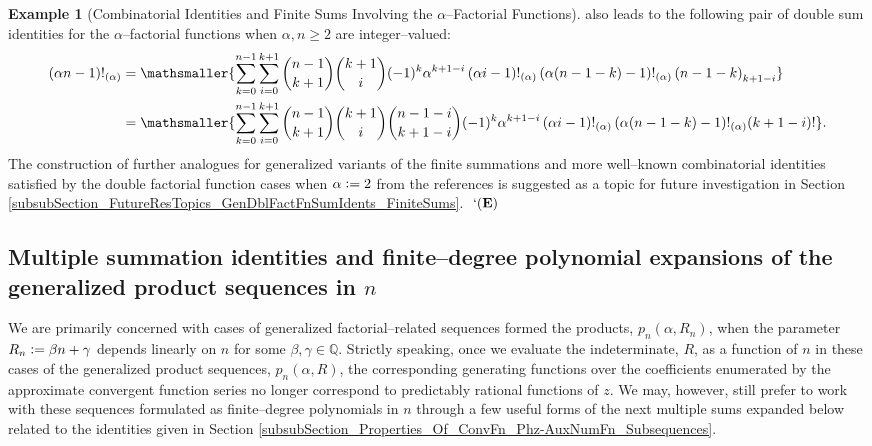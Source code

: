 \documentclass[12pt,reqno]{article}
\numberwithin{sfootnote}{section}
\numberwithin{equation}{section}
\theoremstyle{DefaultTheoremStyle}
\theoremstyle{definition}
\newtheorem{example}[theorem]{Example}
\newcommand{\eolqedsymbol}[1]{{\hrulefill\ensuremath{\ #1}}}
\renewcommand{\eolqedsymbol}[1]{{\mboxfill{ }\ensuremath{\ #1}}}
\newcommand{\ExampleQEDSymbol}{`(\text{\rm{\bf E}})}
\newcommand{\ExampleQED}{\eolqedsymbol{\ExampleQEDSymbol}}
\newcommand{\defequals}{\ensuremath{\vcentcolon=}}
\newcommand{\Pochhammer}[2]{\ensuremath{\left(#1\right)_{#2}}}
\newcommand{\AlphaFactorial}[2]{\ensuremath{\left(#1\right)!_{\left(#2\right)}}}
\begin{document}
\begin{example}[Combinatorial Identities and Finite Sums Involving the $\alpha$--Factorial Functions]
also leads to the following pair of double sum identities for the 
$\alpha$--factorial functions when $\alpha, n \geq 2$ are integer--valued: 
\begin{align*} 
(\alpha n - 1)!_{(\alpha)} & = 
     \mathsmaller{
     \sum\limits_{k=0}^{n-1} \sum\limits_{i=0}^{k+1} 
     \binom{n-1}{k+1} \binom{k+1}{i} 
     (-1)^{k} \alpha^{k+1-i} 
     \AlphaFactorial{\alpha i-1}{\alpha} 
     \AlphaFactorial{\alpha (n-1-k)-1}{\alpha} 
     \Pochhammer{n-1-k}{k+1-i} 
     } \\ 
     & = 
     \mathsmaller{
     \sum\limits_{k=0}^{n-1} \sum\limits_{i=0}^{k+1} 
     \binom{n-1}{k+1} \binom{k+1}{i} \binom{n-1-i}{k+1-i} 
     (-1)^{k} \alpha^{k+1-i} 
     \AlphaFactorial{\alpha i-1}{\alpha} 
     \AlphaFactorial{\alpha (n-1-k)-1}{\alpha} 
     (k+1-i)! 
     }. 
\end{align*} 
The construction of further 
analogues for generalized variants of the finite summations and 
more well--known combinatorial identities satisfied by the 
double factorial function cases when $\alpha \defequals 2$ from the 
references is suggested as a topic for future investigation in 
Section \ref{subsubSection_FutureResTopics_GenDblFactFnSumIdents_FiniteSums}. 
\ExampleQED
\end{example} 

\subsection{Multiple summation identities and finite--degree polynomial 
            expansions of the generalized product sequences in $n$} 

We are primarily concerned with cases of generalized factorial--related 
sequences formed the products, $p_n(\alpha, R_n)$, when the 
parameter $R_n \defequals \beta n+\gamma$ depends linearly on $n$ for some 
$\beta, \gamma \in \mathbb{Q}$. 
Strictly speaking, once we evaluate the indeterminate, $R$, as a 
function of $n$ in these cases of the generalized product sequences, 
$p_n(\alpha, R)$, the corresponding generating functions over the 
coefficients enumerated by the approximate convergent function series 
no longer correspond to predictably rational functions of $z$. 
We may, however, still prefer to work with these sequences formulated as 
finite--degree polynomials in $n$ through a few useful forms of the 
next multiple sums expanded below related to the identities given in 
Section \ref{subsubSection_Properties_Of_ConvFn_Phz-AuxNumFn_Subsequences}. 
\end{document}
